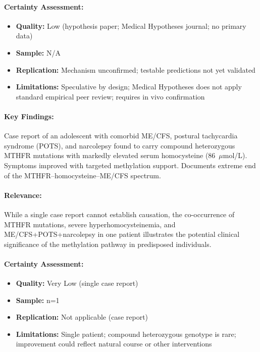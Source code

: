 \paragraph{Certainty Assessment:}
\begin{itemize}
  \item \textbf{Quality:} Low (hypothesis paper; Medical Hypotheses journal; no primary data)
  \item \textbf{Sample:} N/A
  \item \textbf{Replication:} Mechanism unconfirmed; testable predictions not yet validated
  \item \textbf{Limitations:} Speculative by design; Medical Hypotheses does not apply standard
    empirical peer review; requires in vivo confirmation
\end{itemize}

\bigskip


\paragraph{Key Findings:}
Case report of an adolescent with comorbid ME/CFS, postural tachycardia syndrome (POTS), and
narcolepsy found to carry compound heterozygous MTHFR mutations with markedly elevated serum
homocysteine (86~$\mu$mol/L). Symptoms improved with targeted methylation support. Documents
extreme end of the MTHFR--homocysteine--ME/CFS spectrum.

\paragraph{Relevance:}
While a single case report cannot establish causation, the co-occurrence of MTHFR mutations,
severe hyperhomocysteinemia, and ME/CFS+POTS+narcolepsy in one patient illustrates the potential
clinical significance of the methylation pathway in predisposed individuals.

\paragraph{Certainty Assessment:}
\begin{itemize}
  \item \textbf{Quality:} Very Low (single case report)
  \item \textbf{Sample:} n=1
  \item \textbf{Replication:} Not applicable (case report)
  \item \textbf{Limitations:} Single patient; compound heterozygous genotype is rare;
    improvement could reflect natural course or other interventions
\end{itemize}

